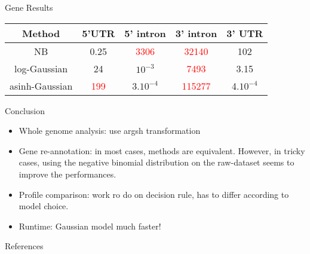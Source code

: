 \documentclass[a4paper]{beamer}
\begin{document}
\begin{frame}{Gene Results}
\begin{table}[h]
\begin{tabular}{c|cccc|}
Method & 5'UTR & 5' intron & 3' intron & 3' UTR \\
\hline
NB &  0.25 &\textcolor{red}{3306}& \textcolor{red}{32140} &  102  \\
log-Gaussian & 24 & $10^{-3}$ & \textcolor{red}{7493} & 3.15 \\
asinh-Gaussian & \textcolor{red}{199} & 3.$10^{-4}$ & \textcolor{red}{115277} & 4.$10^{-4}$ \\
\end{tabular}
\end{table}
\end{frame}

\begin{frame}{Conclusion}
	\begin{itemize}
		\item Whole genome analysis: use argsh transformation
		\item Gene re-annotation: in most cases, methods are equivalent. However, in tricky cases, using the negative binomial distribution on the raw-dataset seems to improve the performances.
		\item Profile comparison: work ro do on decision rule, has to differ according to model choice.
		\item Runtime: Gaussian model much faster!
	\end{itemize}
\end{frame}

\begin{frame}{References}
  \scriptsize
  
  
\end{frame}
\end{document}
